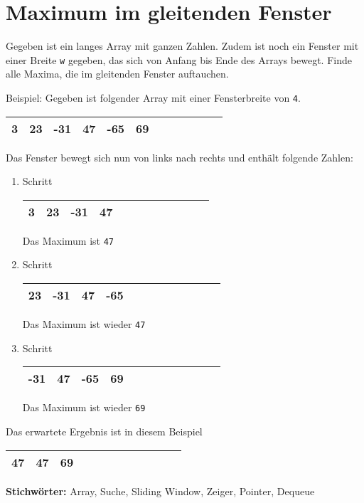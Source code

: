 \documentclass{book}
\begin{document}
\section{Maximum im gleitenden Fenster}
\begin{examplei}
Gegeben ist ein langes Array mit ganzen Zahlen. Zudem ist noch ein Fenster mit einer Breite \lstinline|w| gegeben, das sich von Anfang bis Ende des Arrays bewegt. Finde alle Maxima, die im gleitenden Fenster auftauchen.

Beispiel:
Gegeben ist folgender Array mit einer Fensterbreite von \lstinline|4|. 	

\begin{tabular}{|l|l|l|l|l|l|l|l|l|l|l|l|} 
\hline
3 & 23 & -31 & 47 & -65 & 69 \\
\hline
\end{tabular}
Das Fenster bewegt sich nun von links nach rechts und enthält folgende Zahlen:
\begin{enumerate}
\item Schritt

\begin{tabular}{|l|l|l|l|l|l|l|l|l|l|l|l|} 
\hline
3 & 23 & -31 & 47 \\
\hline
\end{tabular}

Das Maximum ist \lstinline|47|
\item Schritt

\begin{tabular}{|l|l|l|l|l|l|l|l|l|l|l|l|} 
\hline
23 & -31 & 47 & -65 \\
\hline
\end{tabular}

Das Maximum ist wieder \lstinline|47|	

\item Schritt
		
\begin{tabular}{|l|l|l|l|l|l|l|l|l|l|l|l|} 
\hline
-31 & 47 & -65 & 69 \\
\hline
\end{tabular}

Das Maximum ist wieder \lstinline|69|
\end{enumerate}

Das erwartete Ergebnis ist in diesem Beispiel 
\begin{tabular}{|l|l|l|l|l|l|l|l|l|l|l|l|} 
	\hline
	47 & 47 & 69 \\
	\hline
\end{tabular}

\end{examplei}
{\bf Stichwörter:} Array, Suche, Sliding Window, Zeiger, Pointer, Dequeue
\end{document}
